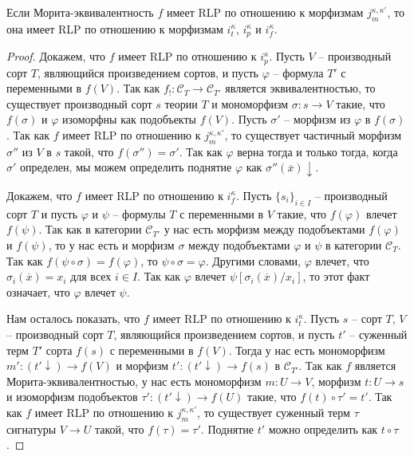 \documentclass[reqno]{amsart}
\theoremstyle{definition}
\theoremstyle{remark}
\newcommand{\cat}[1]{\mathcal{#1}}
\begin{document}
\begin{lem}
Если Морита-эквивалентность $f$ имеет RLP по отношению к морфизмам $j^{\kappa,\kappa'}_m$, то она имеет RLP по отношению к морфизмам $i^\kappa_t$, $i^\kappa_p$ и $i^\kappa_f$.
\end{lem}
\begin{proof}
Докажем, что $f$ имеет RLP по отношению к $i^\kappa_p$.
Пусть $V$ -- производный сорт $T$, являющийся произведением сортов, и пусть $\varphi$ -- формула $T'$ с переменными в $f(V)$.
Так как $f_! : \cat{C}_T \to \cat{C}_{T'}$ является эквивалентностью, то существует производный сорт $s$ теории $T$ и мономорфизм $\sigma : s \to V$ такие, что $f(\sigma)$ и $\varphi$ изоморфны как подобъекты $f(V)$.
Пусть $\sigma'$ -- морфизм из $\varphi$ в $f(\sigma)$.
Так как $f$ имеет RLP по отношению к $j_m^{\kappa,\kappa'}$, то существует частичный морфизм $\sigma''$ из $V$ в $s$ такой, что $f(\sigma'') = \sigma'$.
Так как $\varphi$ верна тогда и только тогда, когда $\sigma'$ определен, мы можем определить поднятие $\varphi$ как $\sigma''(\overline{x})\!\downarrow$.

Докажем, что $f$ имеет RLP по отношению к $i^\kappa_f$.
Пусть $\{ s_i \}_{i \in I}$ -- производный сорт $T$ и пусть $\varphi$ и $\psi$ -- формулы $T$ с переменными в $V$ такие, что $f(\varphi)$ влечет $f(\psi)$.
Так как в категории $\cat{C}_{T'}$ у нас есть морфизм между подобъектами $f(\varphi)$ и $f(\psi)$, то у нас есть и морфизм $\sigma$ между подобъектами $\varphi$ и $\psi$ в категории $\cat{C}_T$.
Так как $f(\psi \circ \sigma) = f(\varphi)$, то $\psi \circ \sigma = \varphi$.
Другими словами, $\varphi$ влечет, что $\sigma_i(\overline{x}) = x_i$ для всех $i \in I$.
Так как $\varphi$ влечет $\psi[\sigma_i(\overline{x})/x_i]$, то этот факт означает, что $\varphi$ влечет $\psi$.

Нам осталось показать, что $f$ имеет RLP по отношению к $i^\kappa_t$.
Пусть $s$ -- сорт $T$, $V$ -- производный сорт $T$, являющийся произведением сортов, и пусть $t'$ -- суженный терм $T'$ сорта $f(s)$ с переменными в $f(V)$.
Тогда у нас есть мономорфизм $m' : (t'\!\downarrow) \to f(V)$ и морфизм $t' : (t'\!\downarrow) \to f(s)$ в $\cat{C}_{T'}$.
Так как $f$ является Морита-эквивалентностью, у нас есть мономорфизм $m : U \to V$, морфизм $t : U \to s$ и изоморфизм подобъектов $\tau' : (t'\!\downarrow) \to f(U)$ такие, что $f(t) \circ \tau' = t'$.
Так как $f$ имеет RLP по отношению к $j_m^{\kappa,\kappa'}$, то существует суженный терм $\tau$ сигнатуры $V \to U$ такой, что $f(\tau) = \tau'$.
Поднятие $t'$ можно определить как $t \circ \tau$.
\end{proof}
\end{document}
